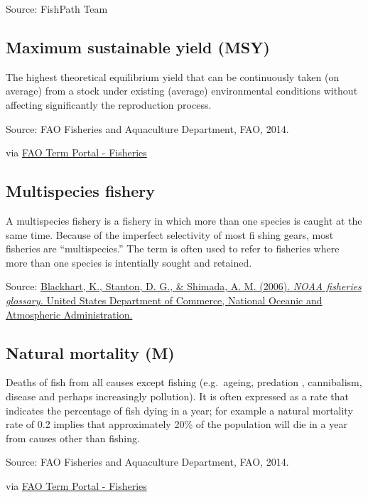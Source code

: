 \documentclass[
  11pt,
]{book}
\begin{document}
Source: FishPath Team

\hypertarget{maximum-sustainable-yield-msy}{%
\subsection{Maximum sustainable yield (MSY)}\label{maximum-sustainable-yield-msy}}

The highest theoretical equilibrium yield that can be continuously taken (on average) from a stock under existing (average) environmental conditions without affecting significantly the reproduction process.

Source: FAO Fisheries and Aquaculture Department, FAO, 2014.

via \href{http://www.fao.org/fishery/glossary/en}{FAO Term Portal - Fisheries}

\hypertarget{multispecies-fishery}{%
\subsection{Multispecies fishery}\label{multispecies-fishery}}

A multispecies fishery is a fishery in which more than one species is caught at the same time. Because of the imperfect selectivity of most fi shing gears, most fisheries are ``multispecies.'' The term is often used to refer to fisheries where more than one species is intentially sought and retained.

Source: \href{https://repository.library.noaa.gov/view/noaa/12856}{Blackhart, K., Stanton, D. G., \& Shimada, A. M. (2006). \emph{NOAA fisheries glossary.} United States Department of Commerce, National Oceanic and Atmospheric Administration.}

\hypertarget{natural-mortality-m}{%
\subsection{Natural mortality (M)}\label{natural-mortality-m}}

Deaths of fish from all causes except fishing (e.g.~ageing, predation , cannibalism, disease and perhaps increasingly pollution). It is often expressed as a rate that indicates the percentage of fish dying in a year; for example a natural mortality rate of 0.2 implies that approximately 20\% of the population will die in a year from causes other than fishing.

Source: FAO Fisheries and Aquaculture Department, FAO, 2014.

via \href{http://www.fao.org/fishery/glossary/en}{FAO Term Portal - Fisheries}
\end{document}
